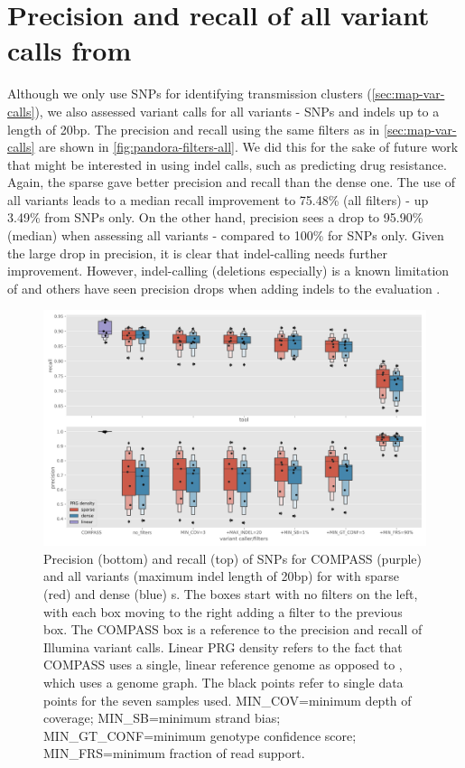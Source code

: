 
\section{Precision and recall of all variant calls from \pandora{}}
\label{app:pandora-all-vars}

Although we only use SNPs for identifying transmission clusters (\autoref{sec:map-var-calls}), we also assessed \pandora{} variant calls for all variants - SNPs and indels up to a length of 20bp. The precision and recall using the same filters as in \autoref{sec:map-var-calls} are shown in \autoref{fig:pandora-filters-all}. We did this for the sake of future work that might be interested in using \pandora{} indel calls, such as predicting drug resistance. Again, the sparse \prg{} gave better precision and recall than the dense one. The use of all variants leads to a median recall improvement to 75.48\% (all filters) - up 3.49\% from SNPs only. On the other hand, precision sees a drop to 95.90\% (median) when assessing all variants - compared to 100\% for SNPs only. Given the large drop in precision, it is clear that \pandora{} indel-calling needs further improvement. However, indel-calling (deletions especially) is a known limitation of \ont{} \cite{jain2018,wick2019} and others have seen precision drops when adding indels to the evaluation \cite{clair2020}.

\begin{figure}
\begin{center}
\includegraphics[width=0.90\columnwidth]{Appendix1/Figs/pandora-precision-recall-filters-all-variants.png}
\caption{{Precision (bottom) and recall (top) of SNPs for COMPASS (purple) and all variants (maximum indel length of 20bp) for \pandora{} with sparse (red) and dense (blue) \prg{}s. The \pandora{} boxes start with no filters on the left, with each box moving to the right adding a filter to the previous box. The COMPASS box is a reference to the precision and recall of Illumina variant calls. Linear PRG density refers to the fact that COMPASS uses a single, linear reference genome as opposed to \pandora{}, which uses a genome graph. The black points refer to single data points for the seven samples used. MIN\_COV=minimum depth of coverage; MIN\_SB=minimum strand bias; MIN\_GT\_CONF=minimum genotype confidence score; MIN\_FRS=minimum fraction of read support.
{\label{fig:pandora-filters-all}}%
}}
\end{center}
\end{figure}


